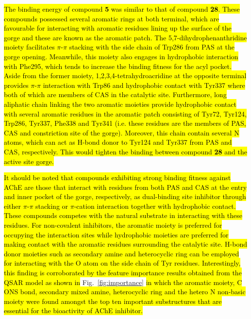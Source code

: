 \documentclass[fleqn,10pt]{wlpeerj}
\begin{document}
\hl{The binding energy of compound \textbf{5} was similar to that of compound \textbf{28}. These compounds possessed several aromatic rings at both terminal, which are favourable for interacting with aromatic residues lining up the surface of the gorge and these are known as the aromatic patch. The 5,7-dihydrophenanthridine moiety facilitates $\pi$-$\pi$ stacking with the side chain of Trp286 from PAS at the gorge opening. Meanwhile, this moiety also engages in hydrophobic interaction with Phe295, which tends to increase the binding fitness for the acyl pocket. Aside from the former moiety, 1,2,3,4-tetrahydroacridine at the opposite terminal provides $\pi$-$\pi$ interaction with Trp86 and hydrophobic contact with Tyr337 where both of which are members of CAS in the catalytic site. Furthermore, long aliphatic chain linking the two aromatic moieties provide hydrophobic contact with several aromatic residues in the aromatic patch consisting of Tyr72, Tyr124, Trp286, Tyr337, Phe338 and Tyr341 (i.e. these residues are the members of PAS, CAS and constriction site of the gorge). Moreover, this chain contain several N atoms, which can act as H-bond donor to Tyr124 and Tyr337 from PAS and CAS, respectively. This would tighten the binding between compound \textbf{28} and the active site gorge.}

\hl{It should be noted that compounds exhibiting strong binding fitness against AChE are those that interact with residues from both PAS and CAS at the entry and inner pocket of the gorge, respectively, as dual-binding site inhibitor through either $\pi$-$\pi$ stacking or $\pi$-cation interaction together with hydrophobic contact. These compounds competes with the natural substrate in interacting with these residues. For non-covalent inhibitors, the aromatic moiety is preferred for occupying the interaction sites while hydrophobic moieties are preferred for making contact with the aromatic residues surrounding the catalytic site. H-bond donor moieties such as secondary amine and heterocyclic ring can be employed for interacting with the O atom on the side chain of Tyr residues. Interestingly, this finding is corroborated by the feature importance results obtained from the QSAR model as shown in} Fig.~\ref{fig:importance} \hl{in which the aromatic moiety, C ONS bond, secondary mixed amine, heterocyclic ring and the hetero N non-basic moiety were found amongst the top ten important substructures that are essential for the bioactivity of AChE inhibitor.}
\end{document}
